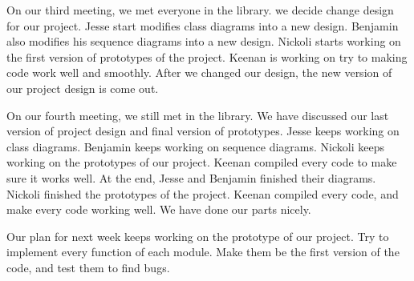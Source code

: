 \documentclass[12pt]{article}
\begin{document}
\par
On our third meeting, we met everyone in the library. we decide change design for our project. Jesse start modifies class diagrams into a new design. Benjamin also modifies his sequence diagrams into a new design. Nickoli starts working on the first version of prototypes of the project. Keenan is working on try to making code work well and smoothly. After we changed our design, the new version of our project design is come out. \\

\par
On our fourth meeting, we still met in the library. We have discussed our last version of project design and final version of prototypes. Jesse keeps working on class diagrams. Benjamin keeps working on sequence diagrams. Nickoli keeps working on the prototypes of our project. Keenan compiled every code to make sure it works well. At the end, Jesse and Benjamin finished their diagrams. Nickoli finished the prototypes of the project. Keenan compiled every code, and make every code working well. We have done our parts nicely. \\

\par
Our plan for next week keeps working on the prototype of our project. Try to implement every function of each module. Make them be the first version of the code, and test them to find bugs. \\

\cite{rubtut}



\end{document}

